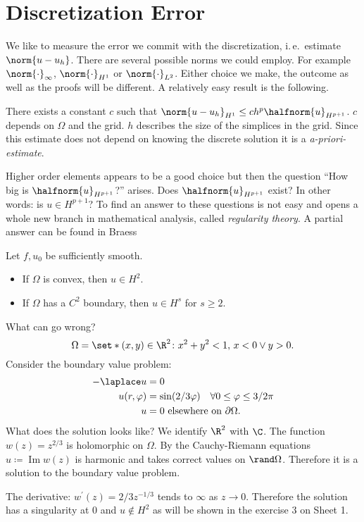\section{Discretization Error}
We like to measure the error we commit with the discretization, i.\,e.\ estimate $\norm{u-u_h}$. There are several possible norms we could employ. For example $\norm{\cdot}_\infty$, $\norm{\cdot}_{H^1}$ or $\norm{\cdot}_{L^2}$. Either choice we make, the outcome as well as the proofs will be different. A relatively easy result is the following.
\begin{theorem}
  There exists a constant $c$ such that $\norm{u-u_h}_{H^1}\leq ch^p\halfnorm{u}_{H^{p+1}}$. $c$ depends on $\Omega$ and the grid. $h$ describes the size of the simplices in the grid. Since this estimate does not depend on knowing the discrete solution it is a \textit{a-priori-estimate}.
\end{theorem}
Higher order elements appears to be a good choice but then
the question \enquote{How big is $\halfnorm{u}_{H^{p+1}}$?} arises. Does $\halfnorm{u}_{H^{p+1}}$ exist? In other words: is $u\in H^{p+1}$? To find an answer to these questions is not easy and opens a whole new branch in mathematical analysis, called \textit{regularity theory}. A partial answer can be found in Braess %
\begin{theorem}%
Let $f,u_0$ be sufficiently smooth.
\begin{itemize}
  \item If $\Omega$ is convex, then $u\in H^2$.
  \item If $\Omega$ has a $C^2$ boundary, then $u\in H^s$ for $s\geq 2$.
\end{itemize}
\end{theorem}
\begin{example}
What can go wrong?
\begin{equation*}
  \Omega=\set*{(x,y)\in\R^2\colon x^2+y^2<1,\,x<0\lor y>0}.
\end{equation*}
Consider the boundary value problem:
\begin{align*}
	-\laplace u&=0\\
	u(r,\varphi)&=\sin(2/3\varphi)\quad \forall 0\leq\varphi\leq3/2\pi \\
	u&=0 \text{ elsewhere on } \partial\Omega.
\end{align*}
What does the solution looks like? We identify $\R^2$ with $\C$. The function $w(z)=z^{2/3}$ is holomorphic on $\Omega$. By the Cauchy-Riemann equations $u \coloneqq \operatorname{Im}w(z)$ is harmonic and takes correct values on $\rand\Omega$. Therefore it is a solution to the boundary value problem.

The derivative: $w^\prime(z)=2/3z^{-1/3}$ tends to $\infty$ as $z\to 0$. Therefore the solution has a singularity at $0$ and $u\notin H^2$ as will be shown in the exercise 3 on Sheet 1.
\end{example}
